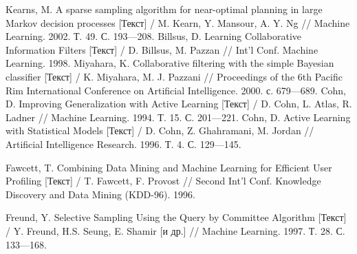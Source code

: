 \begin{thebibliography}{119}
 Kearns, M. A sparse sampling algorithm for near-optimal
planning in large Markov decision processes [Текст]  / M. Kearn, Y. Mansour, A. Y. Ng
// Machine Learning. 2002. Т. 49. С. 193---208.
 Billsus, D. Learning Collaborative Information Filters  [Текст] / D. Billsus, M. Pazzan // Int’l Conf.
Machine Learning. 1998.
 Miyahara, K. Collaborative filtering with the simple Bayesian
classifier  [Текст] / K. Miyahara, M. J. Pazzani // Proceedings of the 6th Pacific Rim International Conference on
Artificial Intelligence. 2000. с. 679---689.
 Cohn, D. Improving Generalization with Active Learning  [Текст] 
/ D. Cohn, L. Atlas, R. Ladner //
Machine Learning. 1994. Т. 15. С. 201---221.
 Cohn, D. Active Learning with Statistical Models
 [Текст] / D. Cohn, Z. Ghahramani, M. Jordan //
Artificial Intelligence Research. 1996. Т. 4. С. 129---145.

 Fawcett, T. Combining Data Mining and Machine Learning for
Efficient User Profiling  [Текст] / T. Fawcett, F. Provost // Second Int’l Conf. Knowledge Discovery and Data
Mining (KDD-96). 1996.

 Freund, Y. Selective Sampling Using the Query by Committee Algorithm  [Текст] / Y. Freund,
H.S. Seung, E. Shamir [и др.] // Machine Learning. 1997. Т. 28. С. 133---168.


\end{thebibliography}
